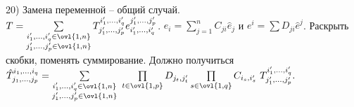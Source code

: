 20) Замена переменной – общий случай.\\
$ T= \sum\limits_{\substack{i'_1,\dots,i'_q \in \ovl{1,n}\\ j'_1,\dots,j'_p \in \ovl{1,n}}} T_{j'_1,\dots,j'_p}^{i'_1,\dots,i'_q} e^{j'_1,\dots,j'_p}_{i'_1,\dots,i'_q}$. $e_i=\sum\limits_{j=1}^nC_{ji}\hat{e}_j$ и $e^i=\sum D_{ji}\hat{e}^j$. Раскрыть скобки, поменять суммирование. Должно получиться $\hat{T}_{j_1,\dots,j_p}^{i_1,\dots,i_q}=\sum\limits_{\substack{i'_1,\dots,i'_q \in \ovl{1,n}\\ j'_1,\dots,j'_p \in \ovl{1,n}}} \,\,\prod\limits_{t\in \ovl{1,p}} D_{j_t,j'_t} \prod\limits_{s\in \ovl{1,q}} C_{i_s,i'_s}  \,\,T_{j'_1,\dots,j'_p}^{i'_1,\dots,i'_q}.$